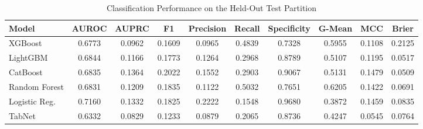 \begin{table}
\centering
\caption{Classification Performance on the Held-Out Test Partition}
\label{tab:results}
\begin{tabular}{lccccccccc}
\toprule
Model & AUROC & AUPRC & F1 & Precision & Recall & Specificity & G-Mean & MCC & Brier \\
\midrule
XGBoost & 0.6773 & 0.0962 & 0.1609 & 0.0965 & 0.4839 & 0.7328 & 0.5955 & 0.1108 & 0.2125 \\
LightGBM & 0.6844 & 0.1166 & 0.1773 & 0.1264 & 0.2968 & 0.8789 & 0.5107 & 0.1195 & 0.0517 \\
CatBoost & 0.6835 & 0.1364 & 0.2022 & 0.1552 & 0.2903 & 0.9067 & 0.5131 & 0.1479 & 0.0509 \\
Random Forest & 0.6831 & 0.1209 & 0.1835 & 0.1122 & 0.5032 & 0.7651 & 0.6205 & 0.1422 & 0.0691 \\
Logistic Reg. & 0.7160 & 0.1332 & 0.1825 & 0.2222 & 0.1548 & 0.9680 & 0.3872 & 0.1459 & 0.0835 \\
TabNet & 0.6332 & 0.0829 & 0.1233 & 0.0879 & 0.2065 & 0.8736 & 0.4247 & 0.0545 & 0.0764 \\
\bottomrule
\end{tabular}
\end{table}
